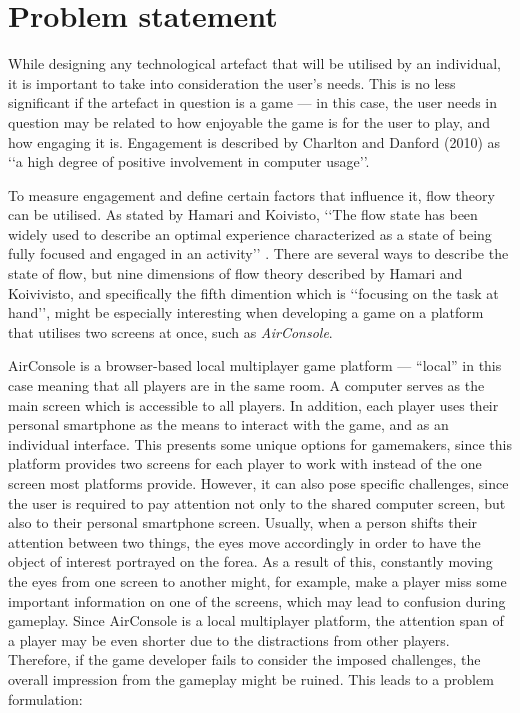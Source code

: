 \chapter{Problem statement}\label{ch:problem}
While designing any technological artefact that will be utilised by an individual, it is important to take into consideration the user's needs. This is no less significant if the artefact in question is a game --- in this case, the user needs in question may be related to how enjoyable the game is for the user to play, and how engaging it is. Engagement is described by Charlton and Danford (2010) \cite{Charlton2010} as ‘‘a high degree of positive involvement in computer usage’’. 

To measure engagement and define certain factors that influence it, flow theory can be utilised. As stated by Hamari and Koivisto, ‘‘The flow state has been widely used to describe an optimal experience characterized as a state of being fully focused and engaged in an activity’’ \cite{Hamari2014}. There are several ways to describe the state of flow, but nine dimensions of flow theory described by Hamari and Koivivisto, and specifically the fifth dimention which is ‘‘focusing on the task at hand’’, might be especially interesting when developing a game on a platform that utilises two screens at once, such as \textit{AirConsole}.

AirConsole is a browser-based local multiplayer game platform --- “local” in this case meaning that all players are in the same room. A computer serves as the main screen which is accessible to all players. In addition, each player uses their personal smartphone as the means to interact with the game, and as an individual interface. This presents some unique options for gamemakers, since this platform provides two screens for each player to work with instead of the one screen most platforms provide. However, it can also pose specific challenges, since the user is required to pay attention not only to the shared computer screen, but also to their personal smartphone screen. Usually, when a person shifts their attention between two things, the eyes move accordingly in order to have the object of interest portrayed on the forea. As a result of this, constantly moving the eyes from one screen to another might, for example, make a player miss some important information on one of the screens, which may lead to confusion during gameplay. Since AirConsole is a local multiplayer platform, the attention span of a player may be even shorter due to the distractions from other players. Therefore, if the game developer fails to consider the imposed challenges, the overall impression from the gameplay might be ruined. This leads to a problem formulation:


